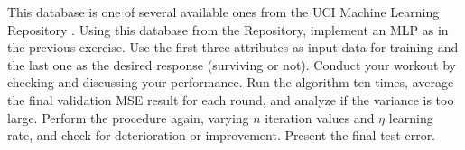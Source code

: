 This database is one of several available ones from the UCI Machine Learning Repository \cite{Dua:2019}. Using this database from the Repository, implement an MLP as in the previous exercise. Use the first three attributes as input data for training and the last one as the desired response (surviving or not). Conduct your workout by checking and discussing your performance. Run the algorithm ten times, average the final validation MSE result for each round, and analyze if the variance is too large. Perform the procedure again, varying $n$ iteration values and $\eta$ learning rate, and check for deterioration or improvement. Present the final test error.



